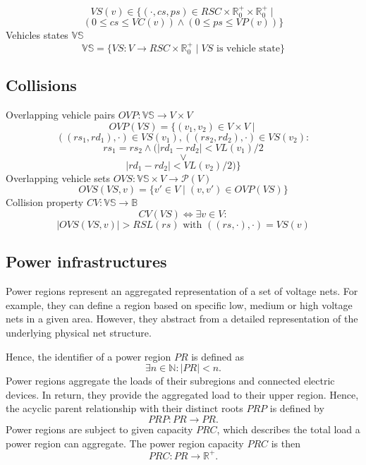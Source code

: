 \[
VS(v) \in \{ (\cdot, cs, ps) \in RSC \times \mathbb{R}_0^+ \times \mathbb{R}_0^+ \mid
\]
\[
(0 \leq cs \leq VC(v)) \wedge (0 \leq ps \leq VP(v)) \}
\]
Vehicles states $\mathbb{VS}$ 
\[
\mathbb{VS} = \{VS : V \rightarrow RSC \times \mathbb{R}_0^+ \mid VS \text{ is vehicle state}\}
\]

\subsection{Collisions}
\label{collisions}

Overlapping vehicle pairs $OVP : \mathbb{VS} \rightarrow V \times V$
\[
OVP(VS) = \{(v_1, v_2) \in V \times V \mid
\]
\[
((rs_1,rd_1),\cdot) \in VS(v_1), ((rs_2,rd_2),\cdot) \in VS(v_2) :
\]
\[
rs_1 = rs_2 \wedge (|rd_1 - rd_2| < VL(v_1) / 2
\]
\[
\vee
\]
\[
|rd_1 - rd_2| < VL(v_2) / 2)\}
\]
Overlapping vehicle sets $OVS : \mathbb{VS} \times V \rightarrow \mathcal{P}(V)$
\[
OVS(VS,v) = \{v' \in V \mid (v, v') \in OVP(VS)\}
\]
Collision property $CV : \mathbb{VS} \rightarrow \mathbb{B}$
\[
CV(VS) \Leftrightarrow \exists v \in V :
\]
\[
|OVS(VS, v)| > RSL(rs) \text{ with } ((rs,\cdot),\cdot) = VS(v)
\]

\subsection{Power infrastructures}
\label{power}

Power regions represent an aggregated representation of a set of voltage nets. For example, they can define a region based on specific low, medium or high voltage nets in a given area. However, they abstract from a detailed representation of the underlying physical net structure.  

Hence, the identifier of a power region $PR$ is defined as
\[
\exists n \in \mathbb{N} : |PR| < n \mathrm{.}
\]
Power regions aggregate the loads of their subregions and connected electric devices. In return, they provide the aggregated load to their upper region.
Hence, the acyclic parent relationship with their distinct roots $PRP$ is defined by 
\[
PRP : PR \to PR \mathrm{.}
\]
Power regions are subject to given capacity $PRC$, which describes the total load a power region can aggregate.
The power region capacity $PRC$ is then
\[
PRC : PR \rightarrow \mathbb{R}^+ \mathrm{.}
\]

